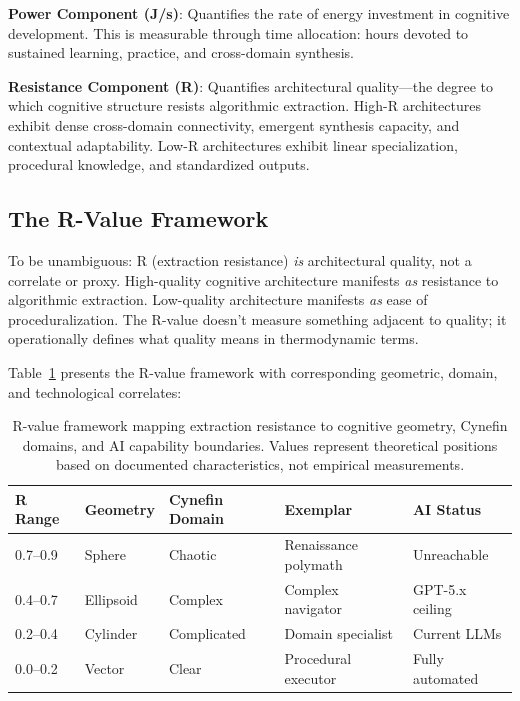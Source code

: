 \textbf{Power Component (J/s)}: Quantifies the rate of energy investment in cognitive development. This is measurable through time allocation: hours devoted to sustained learning, practice, and cross-domain synthesis.

\textbf{Resistance Component (R)}: Quantifies architectural quality---the degree to which cognitive structure resists algorithmic extraction. High-R architectures exhibit dense cross-domain connectivity, emergent synthesis capacity, and contextual adaptability. Low-R architectures exhibit linear specialization, procedural knowledge, and standardized outputs.

\subsection{The R-Value Framework}

To be unambiguous: R (extraction resistance) \textit{is} architectural quality, not a correlate or proxy. High-quality cognitive architecture manifests \textit{as} resistance to algorithmic extraction. Low-quality architecture manifests \textit{as} ease of proceduralization. The R-value doesn't measure something adjacent to quality; it operationally defines what quality means in thermodynamic terms.

Table~\ref{tab:r-values} presents the R-value framework with corresponding geometric, domain, and technological correlates:

\begin{table}[htbp]
\centering
\begin{tabular}{lllll}
\toprule
\textbf{R Range} & \textbf{Geometry} & \textbf{Cynefin Domain} & \textbf{Exemplar} & \textbf{AI Status} \\
\midrule
0.7--0.9 & Sphere & Chaotic & Renaissance polymath & Unreachable \\
0.4--0.7 & Ellipsoid & Complex & Complex navigator & GPT-5.x ceiling \\
0.2--0.4 & Cylinder & Complicated & Domain specialist & Current LLMs \\
0.0--0.2 & Vector & Clear & Procedural executor & Fully automated \\
\bottomrule
\end{tabular}
\caption{R-value framework mapping extraction resistance to cognitive geometry, Cynefin domains, and AI capability boundaries. Values represent theoretical positions based on documented characteristics, not empirical measurements.}
\label{tab:r-values}
\end{table}

